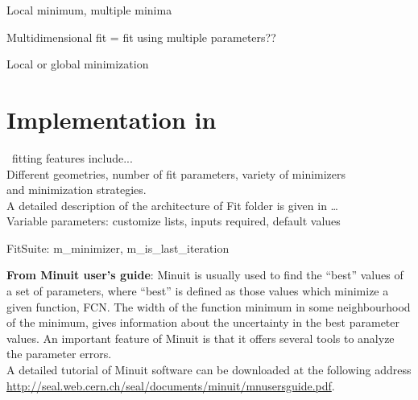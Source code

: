 Local minimum, multiple minima

Multidimensional fit = fit using multiple parameters??

Local or global minimization



\section{Implementation in \BornAgain}
\BornAgain\ fitting features include...\\
Different geometries, number of fit parameters, variety of minimizers\\
and minimization strategies.\\
A detailed description of the architecture of Fit folder is given in
\ldots \\
Variable parameters: customize lists, inputs required, default values

FitSuite: m\_minimizer, m\_is\_last\_iteration

\textbf{From Minuit user's guide}: Minuit is usually used to find the ``best'' values of a set of
parameters, where ``best'' is defined as those values which minimize a
given function, FCN. The width of the function minimum in some
neighbourhood of the minimum, gives information about the uncertainty
in the best parameter values. An important feature of Minuit is that
it offers several tools to analyze the parameter errors.\\

A detailed tutorial of Minuit software can be downloaded at the
following address \url{http://seal.web.cern.ch/seal/documents/minuit/mnusersguide.pdf}.

